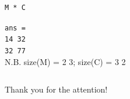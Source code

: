 \documentclass[aspectratio=169]{beamer}
\begin{document}
\begin{frame}[fragile]{}
\begin{columns}
\begin{itemize}
            \begin{verbatim}
M * C
            \end{verbatim}
            \texttt{ans =} \\
            \texttt{14 \hspace{3em}32} \\
            \texttt{32 \hspace{3em}77} \\
            \alert{N.B. size(M) = 2 3; size(C) =  3 2}
        \end{itemize}
    \end{columns}
\end{frame}

{
    \begin{frame}[standout]
        Thank you for the attention!
    \end{frame}
}
\end{document}
